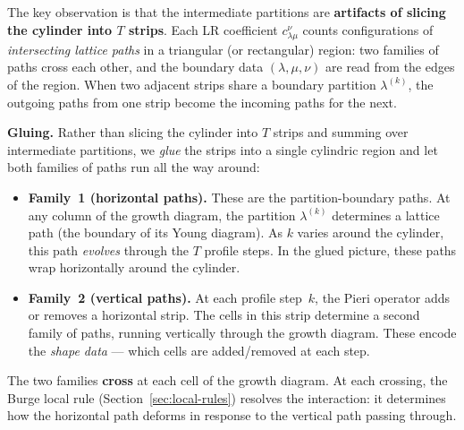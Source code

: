 \documentclass[11pt]{article}
\theoremstyle{plain}
\theoremstyle{definition}
\theoremstyle{remark}
\begin{document}
The key observation is that the intermediate partitions are
\textbf{artifacts of slicing the cylinder into $T$ strips}.
Each LR coefficient $c^{\nu}_{\lambda\mu}$ counts configurations
of \emph{intersecting lattice paths} in a triangular (or
rectangular) region: two families of paths cross each other, and
the boundary data $(\lambda, \mu, \nu)$ are read from the edges of
the region.  When two adjacent strips share a boundary partition
$\lambda^{(k)}$, the outgoing paths from one strip become the
incoming paths for the next.

\textbf{Gluing.}
Rather than slicing the cylinder into $T$ strips and summing over
intermediate partitions, we \emph{glue} the strips into a single
cylindric region and let both families of paths run all the way
around:
\begin{itemize}
\item \textbf{Family~1 (horizontal paths).}
  These are the partition-boundary paths.  At any column of the
  growth diagram, the partition $\lambda^{(k)}$ determines a
  lattice path (the boundary of its Young diagram).  As $k$ varies
  around the cylinder, this path \emph{evolves} through the $T$
  profile steps.  In the glued picture, these paths wrap
  horizontally around the cylinder.

\item \textbf{Family~2 (vertical paths).}
  At each profile step~$k$, the Pieri operator adds or removes a
  horizontal strip.  The cells in this strip determine a second
  family of paths, running vertically through the growth diagram.
  These encode the \emph{shape data} --- which cells are
  added/removed at each step.
\end{itemize}
The two families \textbf{cross} at each cell of the growth diagram.
At each crossing, the Burge local rule
(Section~\ref{sec:local-rules}) resolves the interaction:
it determines how the horizontal path deforms in response to
the vertical path passing through.
\end{document}
